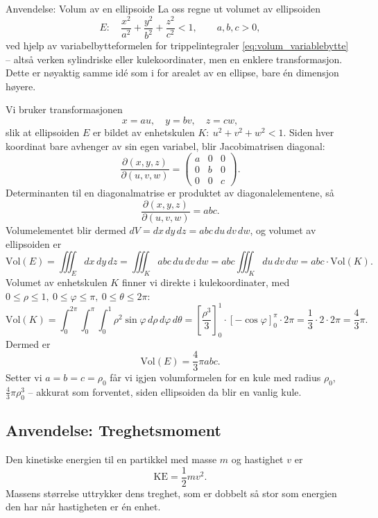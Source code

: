 \begin{eks}{Anvendelse: Volum av en ellipsoide}
La oss regne ut volumet av ellipsoiden
\[
E:\quad \frac{x^2}{a^2}+\frac{y^2}{b^2}+\frac{z^2}{c^2} < 1, \qquad a,b,c>0,
\]
ved hjelp av variabelbytteformelen for trippelintegraler \eqref{eq:volum_variablebytte} -- altså verken sylindriske eller kulekoordinater, men en enklere transformasjon. Dette er nøyaktig samme idé som i  for arealet av en ellipse, bare én dimensjon høyere.

Vi bruker transformasjonen
\[
x = au, \quad y = bv, \quad z = cw,
\]
slik at ellipsoiden $E$ er bildet av enhetskulen $K:\ u^2+v^2+w^2<1$. Siden hver koordinat bare avhenger av sin egen variabel, blir Jacobimatrisen diagonal:
\[
\frac{\partial(x,y,z)}{\partial(u,v,w)} = \begin{pmatrix} a & 0 & 0 \\ 0 & b & 0 \\ 0 & 0 & c \end{pmatrix}.
\]
Determinanten til en diagonalmatrise er produktet av diagonalelementene, så
\[
\frac{\partial(x,y,z)}{\partial(u,v,w)} = abc.
\]
Volumelementet blir dermed $dV=dx\,dy\,dz=abc\,du\,dv\,dw$, og volumet av ellipsoiden er
\[
\text{Vol}(E) = \iiint_E dx\,dy\,dz = \iiint_K abc\, du\,dv\,dw = abc\iiint_K du\,dv\,dw = abc\cdot \text{Vol}(K).
\]
Volumet av enhetskulen $K$ finner vi direkte i kulekoordinater, med $0\leq \rho\leq 1,\ 0\leq \varphi\leq \pi,\ 0\leq\theta\leq 2\pi$:
\[
\text{Vol}(K) = \int_0^{2\pi}\int_0^{\pi}\int_0^1 \rho^2\sin\varphi\, d\rho\, d\varphi\, d\theta = \left[\frac{\rho^3}{3}\right]_0^1 \cdot \left[-\cos\varphi\right]_0^{\pi} \cdot 2\pi = \frac{1}{3}\cdot 2 \cdot 2\pi = \frac{4}{3}\pi.
\]
Dermed er
\[
\text{Vol}(E) = \frac{4}{3}\pi abc.
\]
Setter vi $a=b=c=\rho_0$ får vi igjen volumformelen for en kule med radius $\rho_0$, $\frac{4}{3}\pi \rho_0^3$ -- akkurat som forventet, siden ellipsoiden da blir en vanlig kule.
\end{eks}

\subsection{Anvendelse: Treghetsmoment }
Den kinetiske energien til en partikkel med masse \( m \) og hastighet \( v \) er
\[
\text{KE} = \frac{1}{2}mv^2.
\]
Massens størrelse uttrykker dens treghet, som er dobbelt så stor som energien den har når hastigheten er én enhet.


